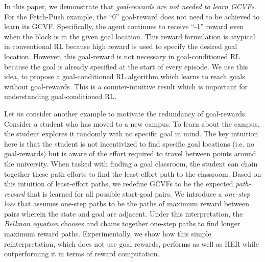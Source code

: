 %
In this paper, we demonstrate that \emph{goal-rewards are not needed to
learn GCVFs}. For the Fetch-Push example, the ``0'' goal-reward does
not need to be achieved to learn its GCVF. Specifically, the agent
continues to receive ``-1'' reward even when the block is in the given
goal location. This reward formulation is atypical in conventional RL
because high reward is used to specify the desired goal location.
However, this goal-reward is not necessary in goal-conditioned RL because the
goal is already specified at the start of every episode.  We use this
idea, to propose a goal-conditioned RL algorithm which learns to reach
goals without goal-rewards. This is a counter-intuitive
result which is important for understanding goal-conditioned RL.

Let us consider another example to motivate the redundancy of goal-rewards.
Consider a student who has moved to a new campus. To learn about the campus,
the student explores it randomly with no specific goal in mind. The key
intuition here is that the student is not incentivized to find specific goal
locations (i.e. no goal-rewards) but is aware of the effort required to travel
between points around the university. When tasked with finding a goal classroom,
the student can chain together these path efforts to find the least-effort path
to the classroom.
%
Based on this intuition of least-effort paths, we redefine GCVFs to be
the expected \emph{path-reward} that is learned for all possible
start-goal pairs. We  
introduce a \emph{one-step loss} that assumes one-step paths 
to be the paths of maximum reward between pairs wherein the state and goal are adjacent.
Under this interpretation, the \emph{Bellman equation} chooses and chains
together one-step paths to find longer maximum reward paths. 
%
Experimentally, we show how this simple reinterpretation, which does not use goal
rewards, performs as well as HER while outperforming it in terms of
reward computation.

